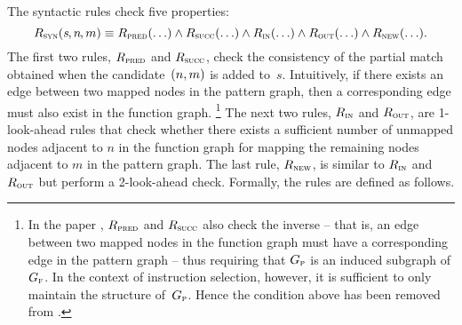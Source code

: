 The syntactic rules check five properties:
%
\begin{equation}
  R_{\textrm{\textsc{syn}}}(s\hspace{-.8pt}, n\hspace{-.8pt}, m) \equiv
  R_{\textrm{\textsc{pred}}}(\ldots) \wedge R_{\textrm{\textsc{succ}}}(\ldots) \wedge
  R_{\textrm{\textsc{in}}}(\ldots) \wedge R_{\textrm{\textsc{out}}}(\ldots) \wedge R_{\textrm{\textsc{new}}}(\ldots).
\end{equation}
%
The first two rules, $R_{\textrm{\textsc{pred}}}$ and $R_{\textrm{\textsc{succ}}}$, check the consistency
of the partial \gls{match} obtained when the candidate~\mbox{$\mPair{n}{m}$} is
added to~$s$\hspace{-.8pt}.
%
Intuitively, if there exists an \gls{edge} between two mapped \glspl{node} in
the \gls{pattern graph}, then a corresponding \gls{edge} must also exist in the
\gls{function graph}.\!%
%
\footnote{%
  In the paper \cite{CordellaEtAl:2001}, $R_{\textrm{\textsc{pred}}}$ and $R_{\textrm{\textsc{succ}}}$
  also check the inverse -- that is, an \gls{edge} between two mapped
  \glspl{node} in the \gls{function graph} must have a corresponding \gls{edge}
  in the \gls{pattern graph} -- thus requiring that $G_{\textrm{\textsc{p}}}$ is an induced
  \gls{subgraph} of $G_{\textrm{\textsc{f}}}$.
  In the context of \gls{instruction selection}, however, it is sufficient to
  only maintain the structure of~$G_{\textrm{\textsc{p}}}$.
  Hence the condition above has been removed from
  .%
}
%
The next two rules, $R_{\textrm{\textsc{in}}}$ and $R_{\textrm{\textsc{out}}}$, are \num{1}-look-ahead
rules that check whether there exists a sufficient number of unmapped
\glspl{node} adjacent to $n$ in the \gls{function graph} for mapping the
remaining \glspl{node} adjacent to $m$ in the \gls{pattern graph}.
%
The last rule, $R_{\textrm{\textsc{new}}}$, is similar to $R_{\textrm{\textsc{in}}}$ and $R_{\textrm{\textsc{out}}}$
but perform a \num{2}-look-ahead check.
%
Formally, the rules are defined as follows.
%
